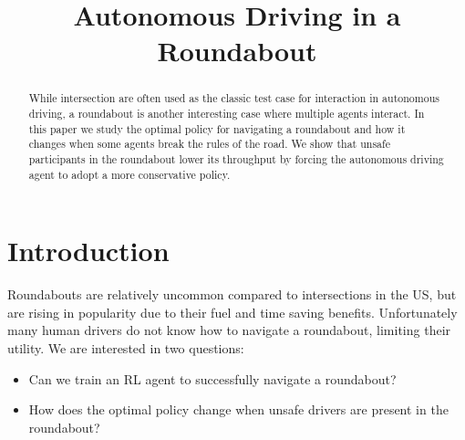 \documentclass[conference]{IEEEtran}
\begin{document}
\title{Autonomous Driving in a Roundabout}

\author{
\and
{}
}

\maketitle

\begin{abstract}
While intersection are often used as the classic test case for interaction in autonomous driving, a roundabout is another interesting case where multiple agents interact. In this paper we study the optimal policy for navigating a roundabout and how it changes when some agents break the rules of the road. We show that unsafe participants in the roundabout lower its throughput by forcing the autonomous driving agent to adopt a more conservative policy.
\end{abstract}


\section{Introduction}
Roundabouts are relatively uncommon compared to intersections in the US, %
but are rising in popularity due to their fuel and time saving benefits. Unfortunately many human drivers do not know how to navigate a roundabout, limiting their utility. We are interested in two questions:
\begin{itemize}
	\item Can we train an RL agent to successfully navigate a roundabout?
	\item How does the optimal policy change when unsafe drivers are present in the roundabout?
\end{itemize}
\end{document}
